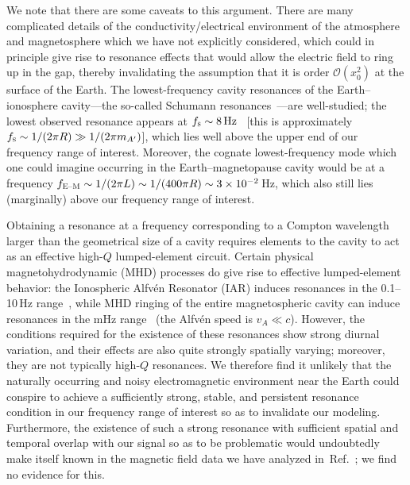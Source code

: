 \documentclass[amsmath,amssymb,aps,10pt,prd,letterpaper,nofootinbib,balancelastpage,notitlepage,superscriptaddress,twocolumn,floatfix]{revtex4-2}
\newcommand{\citeR}[2][]{Ref{#1}.~\cite{#2}}		%
\begin{document}
We note that there are some caveats to this argument.
There are many complicated details of the conductivity/electrical environment of the atmosphere and magnetosphere which we have not explicitly considered, which could in principle give rise to resonance effects that would allow the electric field to ring up in the gap, thereby invalidating the assumption that it is order $\mathcal O(x_0^2)$ at the surface of the Earth.
The lowest-frequency cavity resonances of the Earth--ionosphere cavity---the so-called Schumann resonances~\cite{Schumann+1952+149+154,bliokh1980schumann,Satori2009}---are well-studied; the lowest observed resonance appears at $f_{\textsc{s}} \sim8\,\text{Hz}$~\cite{bliokh1980schumann} [this is approximately $f_{\textsc{s}} \sim 1/ (2\pi R) \gg 1/(2\pi m_{A'})$], which lies well above the upper end of our frequency range of interest.
Moreover, the cognate lowest-frequency mode which one could imagine occurring in the Earth--magnetopause cavity would be at a frequency $f_{\textsc{E--M}} \sim 1/ (2\pi L ) \sim 1/ (400 \pi R )\sim 3\times 10^{-2}\,$Hz, which also still lies (marginally) above our frequency range of interest.

Obtaining a resonance at a frequency corresponding to a Compton wavelength larger than the geometrical size of a cavity requires elements to the cavity to act as an effective high-$Q$ lumped-element circuit.
Certain physical magnetohydrodynamic (MHD) processes do give rise to effective lumped-element behavior: the Ionospheric Alfv\'en Resonator (IAR) induces resonances in the 0.1--10\,Hz range~\cite{BELYAEV1990781,yahnin2003morphology,bosinger2004fine,Boesinger:2008eth,sanfui2016studies,Nose:2017wdf,NokesMSc}, while MHD ringing of the entire magnetospheric cavity can induce resonances in the mHz range~\cite{Troitskaya:1967efh,Pilipenko:1990dsg,Hughes:1994ouh,sanfui2016studies} (the Alfv\'en speed is $v_A \ll c$).
However, the conditions required for the existence of these resonances show strong diurnal variation, and their effects are also quite strongly spatially varying; moreover, they are not typically high-$Q$ resonances.
We therefore find it unlikely that the naturally occurring and noisy electromagnetic environment near the Earth could conspire to achieve a sufficiently strong, stable, and persistent resonance condition in our frequency range of interest so as to invalidate our modeling.
Furthermore, the existence of such a strong resonance with sufficient spatial and temporal overlap with our signal so as to be problematic would undoubtedly make itself known in the magnetic field data we have analyzed in~\citeR{Fedderke:2021qva}; we find no evidence for this.
\end{document}
